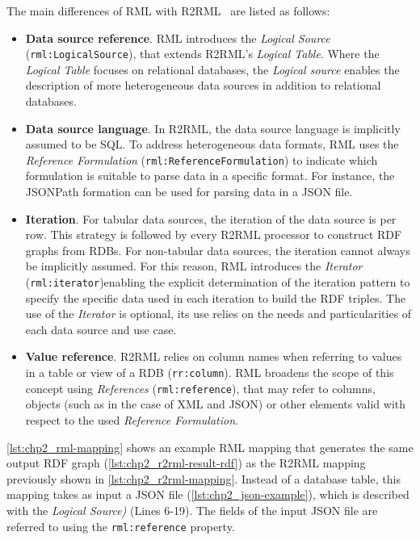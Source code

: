 The main differences of RML with R2RML~\parencite{dimou2020rml-r2rml-diffs} are listed as follows:
\begin{itemize}
    \item \textbf{Data source reference}. RML introduces the \textit{Logical Source} (\texttt{rml:LogicalSource}), that extends R2RML's \textit{Logical Table}. Where the \textit{Logical Table} focuses on relational databases, the \textit{Logical source} enables the description of more heterogeneous data sources in addition to relational databases.

    \item \textbf{Data source language}. In R2RML, the data source language is implicitly assumed to be SQL. To address heterogeneous data formats, RML uses the \textit{Reference Formulation} (\texttt{rml:ReferenceFormulation}) to indicate which formulation is suitable to parse data in a specific format. For instance, the JSONPath formation can be used for parsing data in a JSON file. 

    \item \textbf{Iteration}. For tabular data sources, the iteration of the data source is per row. This strategy is followed by every R2RML processor to construct RDF graphs from RDBs. For non-tabular data sources, the iteration cannot always be implicitly assumed. For this reason, RML introduces the \textit{Iterator} (\texttt{rml:iterator})enabling the explicit determination of the iteration pattern to specify the specific data used in each iteration to build the RDF triples. The use of the \textit{Iterator} is optional, its use relies on the needs and particularities of each data source and use case.

    \item \textbf{Value reference}. R2RML relies on column names when referring to values in a table or view of a RDB (\texttt{rr:column}). RML broadens the scope of this concept using \textit{References} (\texttt{rml:reference}), that may refer to columns, objects (such as in the case of XML and JSON) or other elements valid with respect to the used \textit{Reference Formulation}. 
\end{itemize}


\cref{lst:chp2_rml-mapping} shows an example RML mapping that generates the same output RDF graph (\cref{lst:chp2_r2rml-result-rdf}) as the R2RML mapping previously shown in \cref{lst:chp2_r2rml-mapping}. Instead of a database table, this mapping takes as input a JSON file (\cref{lst:chp2_json-example}), which is described with the \textit{Logical Source)} (Lines 6-19). The fields of the input JSON file are referred to using the \texttt{rml:reference} property. 

